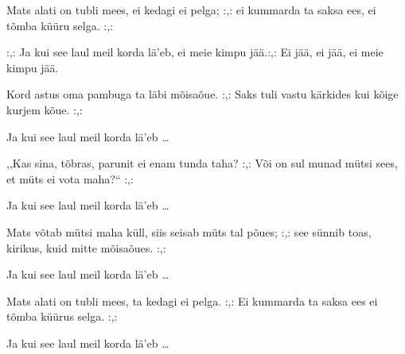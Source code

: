 Mats alati on tubli mees,
ei kedagi ei pelga;
:,: ei kummarda ta saksa ees,
ei t\~omba k\"u\"uru selga. :,:

:,: Ja kui see laul meil korda l\"a'eb,
ei meie kimpu j\"a\"a.:,: 
Ei j\"a\"a, ei j\"a\"a,
ei meie kimpu j\"a\"a.

Kord astus oma pambuga
ta l\"abi m\~oisa\~oue.
:,: Saks tuli vastu k\"arkides
kui k\~oige kurjem k\~oue. :,:

Ja kui see laul meil korda l\"a'eb \ldots

,,Kas sina, t\~obras, parunit
ei enam tunda taha?
:,: V\~oi on sul munad m\"utsi sees,
et m\"uts ei vota maha?{``} :,:

Ja kui see laul meil korda l\"a'eb \ldots

Mats v\~otab m\"utsi maha k\"ull,
siis seisab m\"uts tal p\~oues;
:,: see s\"unnib toas, kirikus,
kuid mitte m\~oisa\~oues. :,:

Ja kui see laul meil korda l\"a'eb \ldots

Mats alati on tubli mees,
ta kedagi ei pelga.
:,: Ei kummarda ta saksa ees
ei t\~omba k\"u\"urus selga. :,:

Ja kui see laul meil korda l\"a'eb \ldots
